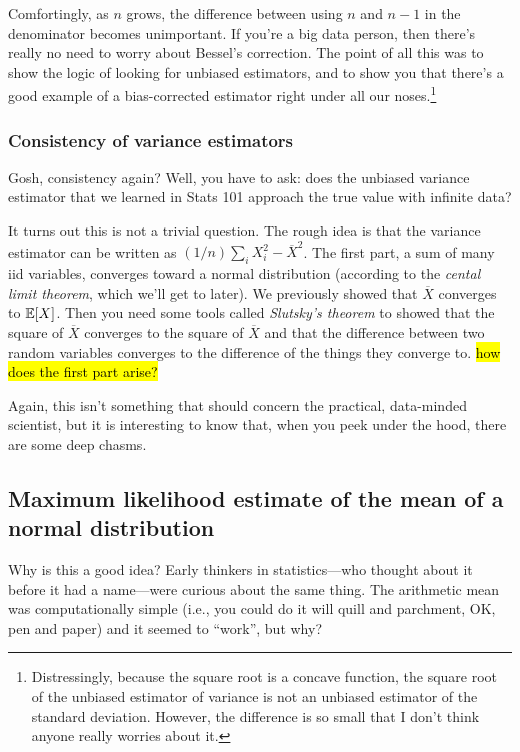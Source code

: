 Comfortingly, as $n$ grows, the difference between using $n$ and $n-1$ in the
denominator becomes unimportant. If you're a big data person, then there's
really no need to worry about Bessel's correction. The point of all this was
to show the logic of looking for unbiased estimators, and to show you that
there's a good example of a bias-corrected estimator right under all our
noses.\footnote{Distressingly, because the square root is a concave function,
the square root of the unbiased estimator of variance is not an unbiased
estimator of the standard deviation. However, the difference is so small that
I don't think anyone really worries about it.}

\subsubsection{Consistency of variance estimators}

Gosh, consistency again? Well, you have to ask: does the unbiased variance
estimator that we learned in Stats 101 approach the true value with infinite
data?

It turns out this is not a trivial question. The rough idea is that the
variance estimator can be written as $(1/n) \sum_i X_i^2 - \overline{X}^2$.
The first part, a sum of many iid variables, converges toward a normal
distribution (according to the \emph{cental limit theorem}, which we'll get to
later). We previously showed that $\overline{X}$ converges to $\mathbb{E}\!\left[{X}\right]$.
Then you need some tools called \emph{Slutsky's theorem} to showed that the
square of $\overline{X}$ converges to the square of $\overline{X}$ and that
the difference between two random variables converges to the difference of the
things they converge to. \hl{how does the first part arise?}

Again, this isn't something that should concern the practical, data-minded
scientist, but it is interesting to know that, when you peek under the hood,
there are some deep chasms.

\subsection{Maximum likelihood estimate of the mean of a normal distribution}

Why is this a good idea? Early thinkers in statistics---who thought
about it before it had a name---were curious about the same thing. The
arithmetic mean was computationally simple (i.e., you could do it will
quill and parchment, OK, pen and paper) and it seemed to ``work'', but
why?

